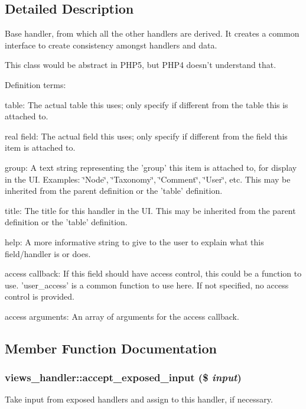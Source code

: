 \subsection{Detailed Description}
Base handler, from which all the other handlers are derived. It creates a common interface to create consistency amongst handlers and data.

This class would be abstract in PHP5, but PHP4 doesn't understand that.

Definition terms:
\begin{DoxyItemize}
\item table: The actual table this uses; only specify if different from the table this is attached to.
\item real field: The actual field this uses; only specify if different from the field this item is attached to.
\item group: A text string representing the 'group' this item is attached to, for display in the UI. Examples: \char`\"{}Node\char`\"{}, \char`\"{}Taxonomy\char`\"{}, \char`\"{}Comment\char`\"{}, \char`\"{}User\char`\"{}, etc. This may be inherited from the parent definition or the 'table' definition.
\item title: The title for this handler in the UI. This may be inherited from the parent definition or the 'table' definition.
\item help: A more informative string to give to the user to explain what this field/handler is or does.
\item access callback: If this field should have access control, this could be a function to use. 'user\_\-access' is a common function to use here. If not specified, no access control is provided.
\item access arguments: An array of arguments for the access callback. 
\end{DoxyItemize}

\subsection{Member Function Documentation}
\hypertarget{classviews__handler_a20433153babc3196b26ee773755a709e}{
\subsubsection[{accept\_\-exposed\_\-input}]{\setlength{\rightskip}{0pt plus 5cm}views\_\-handler::accept\_\-exposed\_\-input (\$ {\em input})}}
\label{classviews__handler_a20433153babc3196b26ee773755a709e}
Take input from exposed handlers and assign to this handler, if necessary. 

